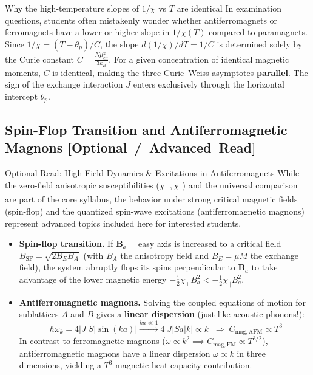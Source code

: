 \documentclass[11pt,a4paper]{article}
\newcommand{\extratag}{\hfill\mbox{\normalfont\footnotesize\sffamily\color{secondary}\textbf{[Optional / Advanced Read]}}}
\newcommand{\vb}[1]{\mathbf{#1}}
\begin{document}
\begin{pitfallbox}{Why the high-temperature slopes of $1/\chi$ vs $T$ are identical}
In examination questions, students often mistakenly wonder whether antiferromagnets or ferromagnets have a lower or higher slope in $1/\chi(T)$ compared to paramagnets. Since $1/\chi = (T - \theta_p)/C$, the slope $d(1/\chi)/dT = 1/C$ is determined solely by the Curie constant $C = \frac{N \mu_{\mathrm{eff}}^2}{3 k_B}$. For a given concentration of identical magnetic moments, $C$ is identical, making the three Curie--Weiss asymptotes \textbf{parallel}. The sign of the exchange interaction $J$ enters exclusively through the horizontal intercept $\theta_p$.
\end{pitfallbox}

\subsection[Spin-Flop and Antiferromagnetic Magnons (Optional Read)]{Spin-Flop Transition and Antiferromagnetic Magnons \extratag}
\label{sec:spinflop_magnons}

\begin{enrichmentnote}{Optional Read: High-Field Dynamics \& Excitations in Antiferromagnets}
While the zero-field anisotropic susceptibilities ($\chi_\perp, \chi_\parallel$) and the universal comparison are part of the core syllabus, the behavior under strong critical magnetic fields (spin-flop) and the quantized spin-wave excitations (antiferromagnetic magnons) represent advanced topics included here for interested students.
\end{enrichmentnote}

\begin{itemize}[leftmargin=1.6cm]
    \item \textbf{Spin-flop transition.}
    If $\vb{B}_a\parallel$ easy axis is increased to a critical field $B_{\mathrm{SF}} = \sqrt{2B_EB_A}$ (with $B_A$ the anisotropy field and $B_E = \mu M$ the exchange field), the system abruptly flops its spins perpendicular to $\vb{B}_a$ to take advantage of the lower magnetic energy $-\frac{1}{2}\chi_\perp B_a^2 < -\frac{1}{2}\chi_\parallel B_a^2$.
    \item \textbf{Antiferromagnetic magnons.}
    Solving the coupled equations of motion for sublattices $A$ and $B$ gives a \textbf{linear dispersion} (just like acoustic phonons!):
    \begin{equation}
        \boxed{\;\hbar\omega_k = 4|J|S|\sin(ka)| \xrightarrow{ka\ll1} 4|J|Sa|k| \propto k\;}
        \;\Longrightarrow\; C_{\mathrm{mag,AFM}}\propto T^3
        \label{eq:afmmagnon}
    \end{equation}
    In contrast to ferromagnetic magnons ($\omega \propto k^2 \implies C_{\mathrm{mag,FM}} \propto T^{3/2}$), antiferromagnetic magnons have a linear dispersion $\omega \propto k$ in three dimensions, yielding a $T^3$ magnetic heat capacity contribution.
\end{itemize}
\end{document}
